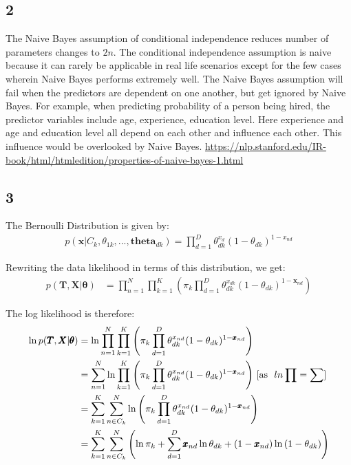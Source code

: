 \documentclass[a4paper]{article}
\begin{document}
\subsection*{2}

The Naive Bayes assumption of conditional independence reduces number of parameters changes to $2n$. The conditional independence assumption is naive because it can rarely be applicable in real life scenarios except for the few cases wherein Naive Bayes performs extremely well. The Naive Bayes assumption will fail when the predictors are dependent on one another, but get ignored by Naive Bayes. For example, when predicting probability of a person being hired, the predictor variables include age, experience, education level. Here experience and age and education level all depend on each other and influence each other. This influence would be overlooked by Naive Bayes. \url{https://nlp.stanford.edu/IR-book/html/htmledition/properties-of-naive-bayes-1.html}



\subsection*{3}
The Bernoulli Distribution is given by:
\begin{align*}
    p(\pmb{x}|C_k, \theta_{1k},...,\pmb{theta}_{dk}) = \prod_{d=1}^{D} \theta_{dk}^{x_{d}}(1-\theta_{dk})^{1-x_{nd}}
\end{align*}{}

Rewriting the data likelihood in terms of this distribution, we get:
\begin{align*}
    p(\pmb{T}, \pmb{X} | \pmb{\theta}) &= \prod_{n=1}^{N} \prod_{k=1}^{K}\left (
    \pi_{k} \prod_{d=1}^{D} \theta_{dk}^{x_{dk}}(1 - \theta_{dk})^{1-\pmb{x}_{nd}}
    \right)
\end{align*}{}

The log likelihood is therefore:
\begin{align*}
    \ln{p(\pmb{T}, \pmb{X} | \pmb{\theta})} &= \ln{\prod_{n=1}^{N} \prod_{k=1}^{K}\left (
    \pi_{k} \prod_{d=1}^{D} \theta_{dk}^{x_{nd}}(1 - \theta_{dk})^{1-\pmb{x}_{nd}}
    \right)} \\
    &= \sum_{n=1}^{N}\ln{\prod_{k=1}^{K}\left (
    \pi_{k} \prod_{d=1}^{D} \theta_{dk}^{x_{nd}}(1 - \theta_{dk})^{1-\pmb{x}_{nd}}
    \right)} \text{ [\bigskip as \ } ln\prod = \sum]\\
    &= \sum_{k=1}^{K}\sum_{n \in C_k}^{N}\ln{\left (
    \pi_{k} \prod_{d=1}^{D} \theta_{dk}^{x_{nd}}(1 - \theta_{dk})^{1-\pmb{x}_{nd}}
    \right)}\\
    &= \sum_{k=1}^{K}\sum_{n \in C_k}^{N} \left ( \ln{\pi_{k}} + \sum_{d=1}^{D}\pmb{x}_{nd}\ln{\theta_{dk}} +
    (1-\pmb{x}_{nd})\ln{(1 - \theta_{dk})} \right )\\
\end{align*}{}
\end{document}
